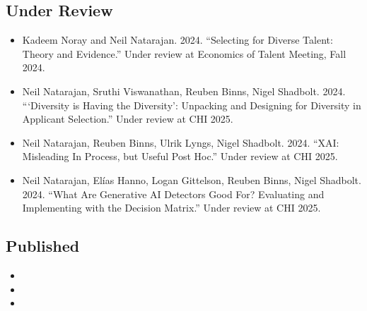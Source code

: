 \subsection{Under Review}
\begin{itemize}
    \item Kadeem Noray and Neil Natarajan. 2024. “Selecting for Diverse Talent: Theory and Evidence.” Under review at Economics of Talent Meeting, Fall 2024.
    \item Neil Natarajan, Sruthi Viswanathan, Reuben Binns, Nigel Shadbolt. 2024. “‘Diversity is Having the Diversity’: Unpacking and Designing for Diversity in Applicant Selection.” Under review at CHI 2025.
    \item Neil Natarajan, Reuben Binns, Ulrik Lyngs, Nigel Shadbolt. 2024. “XAI: Misleading In Process, but Useful Post Hoc.” Under review at CHI 2025.
    \item Neil Natarajan, Elías Hanno, Logan Gittelson, Reuben Binns, Nigel Shadbolt. 2024. “What Are Generative AI Detectors Good For? Evaluating and Implementing with the Decision Matrix.” Under review at CHI 2025.
\end{itemize}

\subsection{Published}

\begin{itemize}
    \item {}
    \item {} 
    \item {}
\end{itemize}



